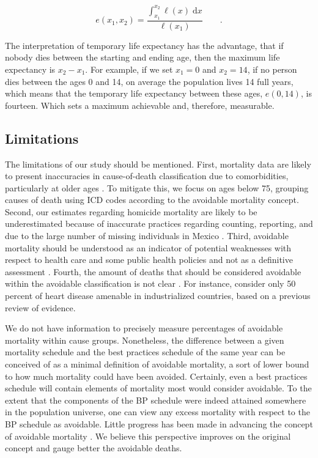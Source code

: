 \documentclass{article}
\newcommand{\dd}{\; \mathrm{d}}
\newcommand{\tp}{\quad\quad\text{.}}
\begin{document}
\begin{spacing}{1.5}
\begin{equation}
e(x_1,x_2) = \frac{\int _{x_1}^{x_2} \ell(x) \dd x}{\ell(x_1)} \tp
\end{equation}

The interpretation of temporary life expectancy has the advantage, that if nobody dies between the starting and ending age, then the maximum life expectancy is $x_2-x_1$.  For example, if we set $x_1=0$ and $x_2=14$, if no person dies between the ages 0 and 14, on average the population lives 14 full years, which means that the temporary life expectancy between these ages, $e(0,14)$, is fourteen. Which sets a maximum achievable and, therefore, measurable.

\subsection*{Limitations}
The limitations of our study should be mentioned. First, mortality data are
likely to present inaccuracies in cause-of-death classification due to
comorbidities, particularly at older ages \citep{tobias2001}. To mitigate this,
we focus on ages below 75, grouping causes of death using ICD codes according to
the avoidable mortality concept.
Second, our estimates regarding homicide mortality are likely to be
underestimated because of inaccurate practices regarding counting, reporting,
and due to the large number of missing individuals in Mexico \citep{HRW2011}.
Third, avoidable mortality should be understood as an indicator of potential
weaknesses with respect to health care and some public health policies and not
as a definitive assessment \citep{nolte&mckee2008}. Fourth, the amount of deaths
that should be considered avoidable within the avoidable classification is not
clear \citep{beltran2011avoidable}. For instance, \citet{nolte2012amenable}
consider only 50 percent of heart disease amenable in industrialized countries,
based on a previous review of evidence.

We do not have information to precisely
measure percentages of avoidable mortality within cause groups. Nonetheless, the
difference between a given mortality schedule and the best practices schedule of
the same year can be conceived of as a minimal definition of avoidable
mortality, a sort of lower bound to how much mortality could have been avoided.
Certainly, even a best practices schedule will contain elements of mortality
most would consider avoidable. To the extent that the components of the BP schedule were indeed
attained somewhere in the population universe, one can view any excess mortality
with respect to the BP schedule as avoidable. Little progress has been made in advancing the concept of avoidable mortality \citep{holland2003}. We believe this perspective improves on the original concept and gauge better the avoidable deaths.


\end{spacing}
\end{document}
